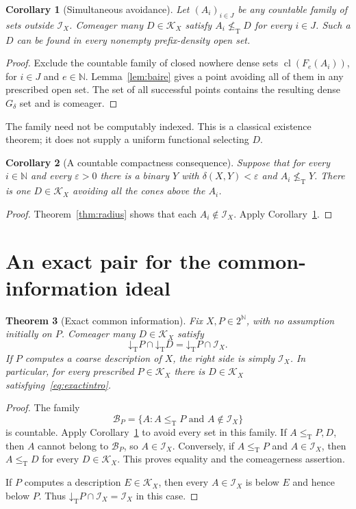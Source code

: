 \documentclass[11pt,a4paper]{article}
\newcommand{\N}{\mathbb N}
\newcommand{\Cantor}{2^{\N}}
\newcommand{\leT}{\leq_{\mathrm T}}
\newcommand{\nleT}{\nleq_{\mathrm T}}
\newcommand{\Core}{\mathcal I}
\newcommand{\low}[1]{\mathord{\downarrow}_{\mathrm T}#1}
\newcommand{\cl}{\operatorname{cl}}
\newtheorem{theorem}{Theorem}[section]
\newtheorem{corollary}[theorem]{Corollary}
\theoremstyle{definition}\newtheorem{definition}[theorem]{Definition}
\theoremstyle{remark}\newtheorem{remark}[theorem]{Remark}
\begin{document}
\begin{corollary}[Simultaneous avoidance]\label{cor:avoid}
Let $(A_i)_{i\in J}$ be any countable family of sets outside $\Core_X$. Comeager many $D\in\mathcal K_X$ satisfy $A_i\nleT D$ for every $i\in J$. Such a $D$ can be found in every nonempty prefix-density open set.
\end{corollary}
\begin{proof}
Exclude the countable family of closed nowhere dense sets $\cl(F_e(A_i))$, for $i\in J$ and $e\in\N$. Lemma~\ref{lem:baire} gives a point avoiding all of them in any prescribed open set. The set of all successful points contains the resulting dense $G_\delta$ set and is comeager.
\end{proof}

The family need not be computably indexed. This is a classical existence theorem; it does not supply a uniform functional selecting $D$.

\begin{corollary}[A countable compactness consequence]\label{cor:countablecompact}
Suppose that for every $i\in\N$ and every $\varepsilon>0$ there is a binary $Y$ with $\delta(X,Y)<\varepsilon$ and $A_i\nleT Y$. There is one $D\in\mathcal K_X$ avoiding all the cones above the $A_i$.
\end{corollary}
\begin{proof}
Theorem~\ref{thm:radius} shows that each $A_i\notin\Core_X$. Apply Corollary~\ref{cor:avoid}.
\end{proof}

\section{An exact pair for the common-information ideal}
\label{sec:exact}
\begin{theorem}[Exact common information]\label{thm:exact}
Fix $X,P\in\Cantor$, with no assumption initially on $P$. Comeager many $D\in\mathcal K_X$ satisfy
\begin{equation}
          \low P\cap\low D=\low P\cap\Core_X.
          \label{eq:generalexact}
\end{equation}
If $P$ computes a coarse description of $X$, the right side is simply $\Core_X$. In particular, for every prescribed $P\in\mathcal K_X$ there is $D\in\mathcal K_X$ satisfying~\eqref{eq:exactintro}.
\end{theorem}
\begin{proof}
The family
\[
          \mathcal B_P=\{A:A\leT P\text{ and }A\notin\Core_X\}
\]
is countable. Apply Corollary~\ref{cor:avoid} to avoid every set in this family. If $A\leT P,D$, then $A$ cannot belong to $\mathcal B_P$, so $A\in\Core_X$. Conversely, if $A\leT P$ and $A\in\Core_X$, then $A\leT D$ for every $D\in\mathcal K_X$. This proves equality and the comeagerness assertion.

If $P$ computes a description $E\in\mathcal K_X$, then every $A\in\Core_X$ is below $E$ and hence below $P$. Thus $\low P\cap\Core_X=\Core_X$ in this case.
\end{proof}
\end{document}
